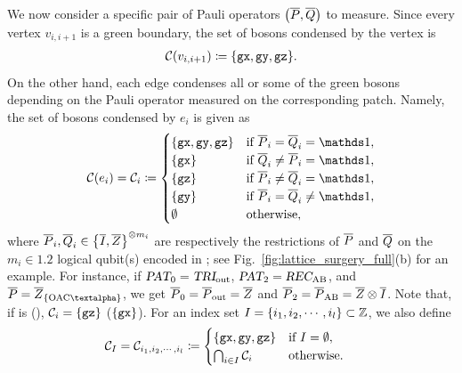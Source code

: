 \documentclass[
 prx,
 reprint,
 superscriptaddress,
 longbibliography,
 dvipsnames
]{revtex4-2}
\begin{document}
We now consider a specific pair of Pauli operators $\qty(\overline{P}, \overline{Q})$ to measure.
Since every vertex $v_{i,i+1}$ is a green boundary, the set of bosons condensed by the vertex is
\begin{align*}
    \mathcal{C}\qty(v_{i,i+1}) \coloneqq \qty{\texttt{gx}, \texttt{gy}, \texttt{gz}}.
\end{align*}
On the other hand, each edge condenses all or some of the green bosons depending on the Pauli operator measured on the corresponding patch.
Namely, the set of bosons condensed by $e_i$ is given as
\begin{align}
    \condset{e_i}= \condsete{i} \coloneqq \begin{cases}
        \qty{\gx, \gy, \gz} & \text{if}~ \lgc{P}_i = \lgc{Q}_i = \identity, \\ 
        \qty{\gx} & \text{if}~ \lgc{Q}_i \neq \lgc{P}_i = \identity, \\ 
        \qty{\gz} & \text{if}~ \lgc{P}_i \neq \lgc{Q}_i = \identity, \\ 
        \qty{\gy} & \text{if}~ \lgc{P}_i = \lgc{Q}_i \neq \identity, \\ 
        \emptyset & \text{otherwise},
    \end{cases}
    \label{eq:condset}
\end{align}
where $\overline{P}_i,\overline{Q}_i \in \qty{\overline{I}, \overline{Z}}^{\otimes m_i}$ are respectively the restrictions of $\overline{P}$ and $\overline{Q}$ on the $m_i \in \qty{1, 2}$ logical qubit(s) encoded in ; see Fig.~\ref{fig:lattice_surgery_full}(b) for an example.
For instance, if $\text{$\textsl{PAT}_{0}$}=\text{$\textsl{TRI}_{\mathrm{out}}$}$, $\text{$\textsl{PAT}_{2}$}=\text{$\textsl{REC}_{\mathrm{AB}}$}$, and $\lgc{P} = \lgztp{OAC\talpha}$, we get $\overline{P}_0 = \overline{P}_{\mathrm{out}} = \overline{Z}$ and $\overline{P}_2 = \overline{P}_{\mathrm{AB}} = \overline{Z} \otimes \overline{I}$.
Note that, if  is \patchalpha (\patchbeta), $\mathcal{C}_{i} = \qty{\texttt{gz}}$ ($\qty{\texttt{gx}}$).
For an index set $I = \qty{i_1, i_2, \cdots, i_l} \subset \mathbb{Z}$, we also define
\begin{align*}
    \mathcal{C}_{I} = \mathcal{C}_{i_1, i_2, \cdots, i_l} &\coloneqq \begin{cases}
        \qty{\texttt{gx}, \texttt{gy}, \texttt{gz}} & \text{if } I = \emptyset, \\ 
        \bigcap_{i \in I} \mathcal{C}_{i} & \text{otherwise}.
    \end{cases}
\end{align*}
\end{document}
